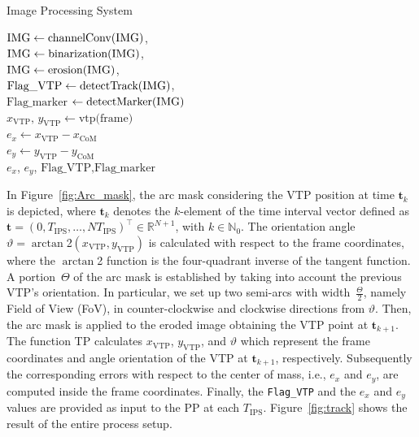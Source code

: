 \documentclass[a4paper,twocolumn,10pt]{article}
\begin{document}
    \begin{algorithm}
        \caption{Image Processing System}
        \label{alg:imageProcessing}
        $\text{IMG}  \gets \text{channelConv(\text{IMG})}$, \\
        $\text{IMG} \gets \text{binarization(\text{IMG})}$, \\
        $\text{IMG} \gets \text{erosion(\text{IMG})}$, \\
        $\text{Flag\_VTP} \gets \text{detectTrack(\text{IMG})}$, \\
        $\text{Flag\_marker}$ $\gets \text{detectMarker(\text{IMG})}$ \\
         {
            \quad $x_\mathrm{VTP} \text{, } y_\mathrm{VTP} \gets \text{vtp(frame)}$ \\
            \quad $e_x \gets x_\mathrm{VTP} - x_\mathrm{CoM}$ \\
            \quad $e_y \gets y_\mathrm{VTP} - y_\mathrm{CoM}$ \\
        }
        \Return $e_x$, $e_y$, $\text{Flag\_VTP}, \text{Flag\_marker}$ 
    \end{algorithm}

    In Figure~\ref{fig:Arc_mask}, the arc mask considering the VTP position at time $\mathbf{t}_k$ 
    is depicted, where $\mathbf{t}_k$ denotes the $k$-element of the time interval vector defined as 
    $\mathbf{t} =(0, T_\mathrm{IPS}, \dots, NT_\mathrm{IPS})^\top \in \mathbb{R}^{N+1}$, with $k \in 
    \mathbb{N}_0$. The orientation angle \mbox{$\vartheta = \arctan$2$(x_\mathrm{VTP},y_\mathrm{VTP})$} 
    is calculated with respect to the frame coordinates, where the $\arctan$2 function is the 
    four-quadrant inverse of the tangent function. A portion~$\varTheta$ of the arc mask is established 
    by taking into account the previous VTP's orientation. In particular, we set up two semi-arcs 
    with width~$\frac{\varTheta}{2}$, namely Field of View (FoV), in counter-clockwise and clockwise 
    directions from $\vartheta$. Then, the arc mask is applied to the eroded image obtaining 
    the VTP point at $\mathbf{t}_{k+1}$. The function TP calculates $x_\mathrm{VTP}$, 
    $y_\mathrm{VTP}$, and $\vartheta$ which represent the frame coordinates and angle orientation of 
    the VTP at  $\mathbf{t}_{k+1}$, respectively. Subsequently the corresponding errors with 
    respect to the center of mass, i.e., $e_x$ and $e_y$, are computed inside the frame coordinates. 
    Finally, the \texttt{Flag\_VTP} and the $e_x$ and $e_y$ values are provided as input to the PP 
    at each $T_\mathrm{IPS}$. Figure~\ref{fig:track} shows the result of the entire process setup. 
\end{document}
